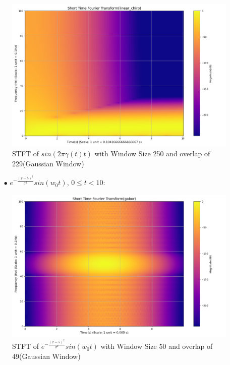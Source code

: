 \documentclass[12pt,a4paper,onecolumn]{exam}
\begin{document}
\begin{solution}
\begin{itemize}
\begin{itemize}
        \begin{figure}[H]
        \centering
        \includegraphics[scale = 0.35]{Gau_Win_linear_chirp_21_250.0.png}
        \caption{STFT of $sin(2\pi\gamma(t)t)$  with Window Size 250 and overlap of 229(Gaussian Window)}
        \label{fig:21}
        \end{figure}

      \begin{itemize}
        \item[$\bullet$] $e^{-\frac{(x-5)^2}{\sigma^2}}sin(w_0t)$, $0 \leq t < 10$:
      \end{itemize}
      
        \begin{figure}[H]
        \centering
        \includegraphics[scale = 0.35]{Gau_Win_gabor_1_50.0.png}
        \caption{STFT of $e^{-\frac{(x-5)^2}{\sigma^2}}sin(w_0t)$ with Window Size 50 and overlap of 49(Gaussian Window)}
        \label{fig:22}
        \end{figure}


\end{itemize}
\end{itemize}
\end{solution}
\end{document}
